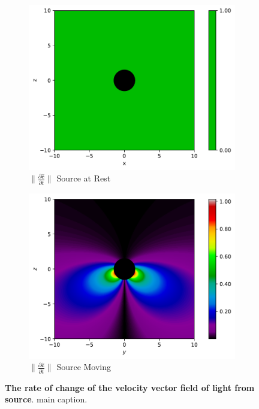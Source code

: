 \begin{figure}[H]
	\centering
	\begin{subfigure}{0.45\textwidth}
		\centering
		\includegraphics[width=\textwidth]{images/pdf/Rate_of_change_of_lights_velocity_field_with_respect_to_t_u_is_0.pdf}
		\caption{$\|\frac{\partial \mathbf{\hat{c}}}{\partial t}\|$ Source at Rest}
		\label{fig: Rate of change of lights velocity field with respect to time subfig_2}
	\end{subfigure}
	\begin{subfigure}{0.45\textwidth}
		\centering
		\includegraphics[width=\textwidth]{images/pdf/Rate_of_change_of_lights_velocity_field_with_respect_to_t.pdf}
		\caption{$\|\frac{\partial \mathbf{\hat{c}}}{\partial t}\|$ Source Moving}
		\label{fig: Rate of change of lights velocity field with respect to time subfig_3}
	\end{subfigure}
	\caption{\textbf{The rate of change of the velocity vector field of light from source}. main caption.}
	\label{fig: Rate of change of lights velocity field with respect to time}
\end{figure}


